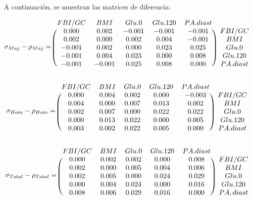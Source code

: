 A continuación, se muestran las matrices de diferencia:


\[
\sigma_{Muj} - \rho_{Muj} = \begin{blockarray}{cccccc}
FBI/GC      &      BMI      &    Glu.0      &  Glu.120      & PA.diast \\
\begin{block}{(ccccc)c}
  0.000 & 0.002 & -0.001 & -0.001  & -0.001 & FBI/GC \\
  0.002 & 0.000 &  0.002 &  0.004  & -0.001 & BMI \\
 -0.001 & 0.002 &  0.000 &  0.023  &  0.025 & Glu.0 \\
 -0.001 & 0.004 &  0.023 &  0.000  &  0.008 & Glu.120 \\
 -0.001 &-0.001 &  0.025 &  0.008  &  0.000 & PA.diast \\
\end{block}
\end{blockarray}
 \]

 \[
\sigma_{Hom} - \rho_{Hom} = \begin{blockarray}{cccccc}
FBI/GC      &      BMI      &    Glu.0      &  Glu.120      & PA.diast \\
\begin{block}{(ccccc)c}
0.000 & 0.004 & 0.002  & 0.000  & -0.003 & FBI/GC \\
0.004 & 0.000 & 0.007  & 0.013  &  0.002 & BMI \\
0.002 & 0.007 & 0.000  & 0.022  &  0.022 & Glu.0 \\
0.000 & 0.013 & 0.022  & 0.000  &  0.005 & Glu.120 \\
0.003 & 0.002 & 0.022  & 0.005  &  0.000 & PA.diast \\   
\end{block}
\end{blockarray}
 \]

 \[
\sigma_{Total} - \rho_{Total} = \begin{blockarray}{cccccc}
FBI/GC      &      BMI      &    Glu.0      &  Glu.120      & PA.diast \\
\begin{block}{(ccccc)c}
 0.000 & 0.002 & 0.002  & 0.000  &  0.008 & FBI/GC \\
 0.002 & 0.000 & 0.005  & 0.004  &  0.006 & BMI \\
 0.002 & 0.005 & 0.000  & 0.024  &  0.029 & Glu.0 \\
 0.000 & 0.004 & 0.024  & 0.000  &  0.016 & Glu.120 \\
 0.008 & 0.006 & 0.029  & 0.016  &  0.000 & PA,diast \\
\end{block}
\end{blockarray}
 \]

